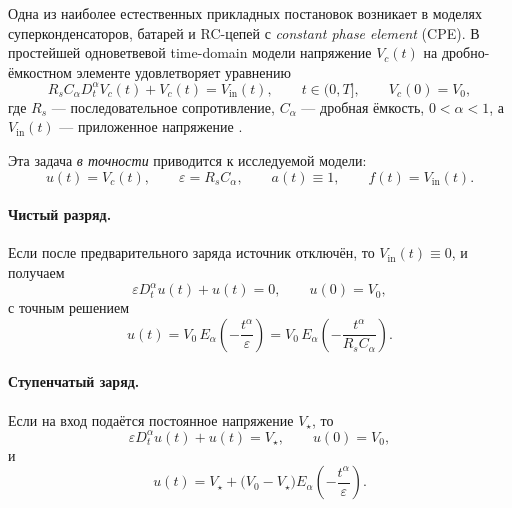 \documentclass[12pt,a4paper]{article}
\theoremstyle{definition}
\newcommand{\eps}{\varepsilon}
\begin{document}
Одна из наиболее естественных прикладных постановок возникает в моделях
суперконденсаторов, батарей и RC-цепей с \emph{constant phase element} (CPE).
В простейшей одноветвевой time-domain модели напряжение $V_c(t)$ на дробно-ёмкостном
элементе удовлетворяет уравнению
\begin{equation}
\label{eq:app-supercap}
R_s C_\alpha D_t^\alpha V_c(t) + V_c(t) = V_{\mathrm{in}}(t),
\qquad
t\in(0,T],
\qquad
V_c(0)=V_0,
\end{equation}
где $R_s$ --- последовательное сопротивление, $C_\alpha$ --- дробная ёмкость,
$0<\alpha<1$, а $V_{\mathrm{in}}(t)$ --- приложенное напряжение
\cite{gomezaguilar2014rc,lopez2022cpe,kothari2021supercap}.

Эта задача \emph{в точности} приводится к исследуемой модели:
\[
u(t)=V_c(t),
\qquad
\eps = R_s C_\alpha,
\qquad
a(t)\equiv 1,
\qquad
f(t)=V_{\mathrm{in}}(t).
\]

\paragraph{Чистый разряд.}
Если после предварительного заряда источник отключён, то $V_{\mathrm{in}}(t)\equiv0$,
и получаем
\begin{equation}
\label{eq:app-supercap-discharge}
\eps D_t^\alpha u(t)+u(t)=0,
\qquad
u(0)=V_0,
\end{equation}
с точным решением
\begin{equation}
\label{eq:app-supercap-discharge-exact}
u(t)=V_0\,E_\alpha\!\left(-\frac{t^\alpha}{\eps}\right)
=
V_0\,E_\alpha\!\left(-\frac{t^\alpha}{R_s C_\alpha}\right).
\end{equation}

\paragraph{Ступенчатый заряд.}
Если на вход подаётся постоянное напряжение $V_\star$, то
\begin{equation}
\label{eq:app-supercap-charge}
\eps D_t^\alpha u(t)+u(t)=V_\star,
\qquad
u(0)=V_0,
\end{equation}
и
\begin{equation}
\label{eq:app-supercap-charge-exact}
u(t)=V_\star + \bigl(V_0-V_\star\bigr)
E_\alpha\!\left(-\frac{t^\alpha}{\eps}\right).
\end{equation}
\end{document}
